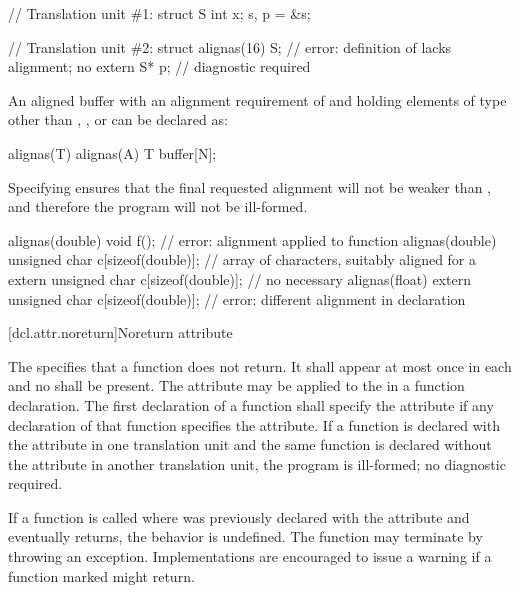 \enterexample
\begin{codeblock}
// Translation unit \#1:
struct S { int x; } s, p = &s;

// Translation unit \#2:
struct alignas(16) S;           // error: definition of  lacks alignment; no
extern S* p;                    // diagnostic required
\end{codeblock}
\exitexample

\pnum
\enterexample An aligned buffer with an alignment requirement
of  and holding  elements of type  other than
, , or 
can be declared as:

\begin{codeblock}
alignas(T) alignas(A) T buffer[N];
\end{codeblock}
Specifying  ensures
that the final requested alignment will not be weaker than ,
and therefore the program will not be ill-formed.
\exitexample

\pnum
\enterexample
\begin{codeblock}
alignas(double) void f();                         // error: alignment applied to function
alignas(double) unsigned char c[sizeof(double)];  // array of characters, suitably aligned for a 
extern unsigned char c[sizeof(double)];           // no  necessary
alignas(float)
  extern unsigned char c[sizeof(double)];         // error: different alignment in declaration
\end{codeblock}
\exitexample

[dcl.attr.noreturn]{Noreturn attribute}%

\pnum
The   specifies that a function does not return. It
shall appear at most once in each  and no
 shall be present. The attribute may be applied to the
 in a function declaration. The first declaration of a function shall
specify the  attribute if any declaration of that function specifies the
 attribute. If a function is declared with the  attribute in one
translation unit and the same function is declared without the  attribute in another
translation unit, the program is ill-formed; no diagnostic required.

\pnum
If a function  is called where  was previously declared with the 
attribute and  eventually returns, the behavior is undefined. \enternote The function may
terminate by throwing an exception. \exitnote \enternote Implementations are encouraged to issue a
warning if a function marked \tcode{[[noreturn]]} might return. \exitnote

